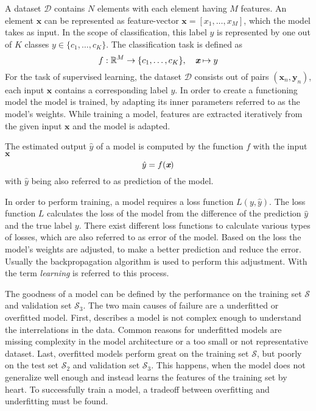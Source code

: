 A dataset $\mathcal{D}$ contains $N$ elements with each element having $M$ features.
An element $\textbf{x}$ can be represented as feature-vector $\textbf{x} = [x_1, \dots ,x_M]$, which the model takes as input.
In the scope of classification, this label $y$ is represented by one out of $K$ classes $y \in \lbrace c_1, \dots, c_K \rbrace$.
The classification task is defined as  
\begin{equation}
	f: \mathbb{R}^M \rightarrow \lbrace c_1,\ldots,c_K \rbrace, \quad \textit{\textbf{x}} \mapsto y
\end{equation}
For the task of supervised learning, the dataset $\mathcal{D}$ consists out of pairs $(\textbf{x}_n, \textbf{y}_n)$, each input $\textbf{x}$ contains a corresponding label $y$.
In order to create a functioning model the model is trained, by adapting its inner parameters referred to as the model's weights.
While training a model, features are extracted iteratively from the given input $\textbf{x}$ and the model is adapted.

The estimated output $\hat{y}$ of a model is computed by the function $f$ with the input $\textbf{x}$
\begin{equation}
	\hat y = f(\textit{\textbf{x}})
\end{equation}
with $\hat{y}$ being also referred to as prediction of the model.

In order to perform training, a model requires a loss function $L(y,\hat{y})$.
The loss function $L$ calculates the loss of the model from the difference of the prediction $\hat{y}$ and the true label $y$.
There exist different loss functions to calculate various types of losses, which are also referred to as error of the model.
Based on the loss the model's weights are adjusted, to make a better prediction and reduce the error.
Usually the backpropagation algorithm is used to perform this adjustment.
With the term \textit{learning} is referred to this process.

The goodness of a model can be defined by the performance on the training set $\mathcal{S}$ and validation set $\mathcal{S}_3$.
The two main causes of failure are a underfitted or overfitted model.
First, describes a model is not complex enough to understand the interrelations in the data.
Common reasons for underfitted models are missing complexity in the model architecture or a too small or not representative dataset.
Last, overfitted models perform great on the training set $\mathcal{S}$, but poorly on the test set $\mathcal{S}_2$ and validation set $\mathcal{S}_3$.
This happens, when the model does not generalize well enough and instead learns the features of the training set by heart.
To successfully train a model, a tradeoff between overfitting and underfitting must be found.

